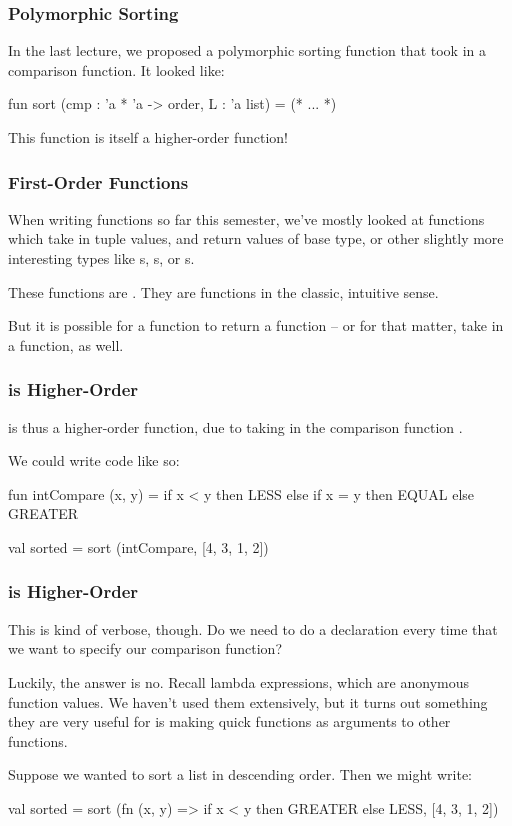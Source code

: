 \documentclass[aspectratio=169]{beamer}
\begin{document}
\begin{frame}[fragile]
  \frametitle{Polymorphic Sorting}

  In the last lecture, we proposed a polymorphic sorting function that took in a 
  comparison function. It looked like:

  \begin{codeblock}
    fun sort (cmp : 'a * 'a -> order, L : 'a list) = (* ... *)
  \end{codeblock}

  This  function is itself a higher-order function!
\end{frame}

\begin{frame}[fragile]
  \frametitle{First-Order Functions}

  When writing functions so far this semester, we've mostly looked at functions which take
  in tuple values, and return values of base type, or other slightly more interesting types
  like s, s, or s.

  These functions are . They are functions in the classic, intuitive sense.

  But it is possible for a function to return a function -- or for that matter, take in a
  function, as well.

\end{frame}

\begin{frame}[fragile]
  \frametitle{ is Higher-Order}

   is thus a higher-order function, due to taking in the comparison function
  .

  We could write code like so:

  \begin{codeblock}
    fun intCompare (x, y) = 
      if x < y then LESS 
      else if x = y then EQUAL 
      else GREATER

    val sorted = sort (intCompare, [4, 3, 1, 2])
  \end{codeblock}
\end{frame}

\begin{frame}[fragile]
  \frametitle{ is Higher-Order}

  This is kind of verbose, though. Do we need to do a  declaration every
  time that we want to specify our comparison function?

  Luckily, the answer is no. Recall lambda expressions, which are anonymous function
  values. We haven't used them extensively, but it turns out something they are very
  useful for is making quick functions as arguments to other functions.

  Suppose we wanted to sort a list in descending order. Then we might write:

  \begin{codeblock}
    val sorted = sort (fn (x, y) => if x < y then GREATER else LESS, [4, 3, 1, 2])
  \end{codeblock}
\end{frame}
\end{document}
